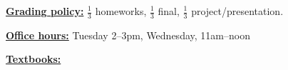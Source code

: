\documentclass{article}
\begin{document}
\begin{flushleft}  \underline{\bf Grading policy:}
     $\frac{1}{3}$ homeworks, $\frac{1}{3}$ final, $\frac{1}{3}$ project/presentation.  \end{flushleft}

\begin{flushleft} \underline{\bf Office hours:} Tuesday 2--3pm, Wednesday, 11am--noon   \end{flushleft}



\begin{flushleft}   \underline{\bf Textbooks:}   \end{flushleft}
\end{document}
